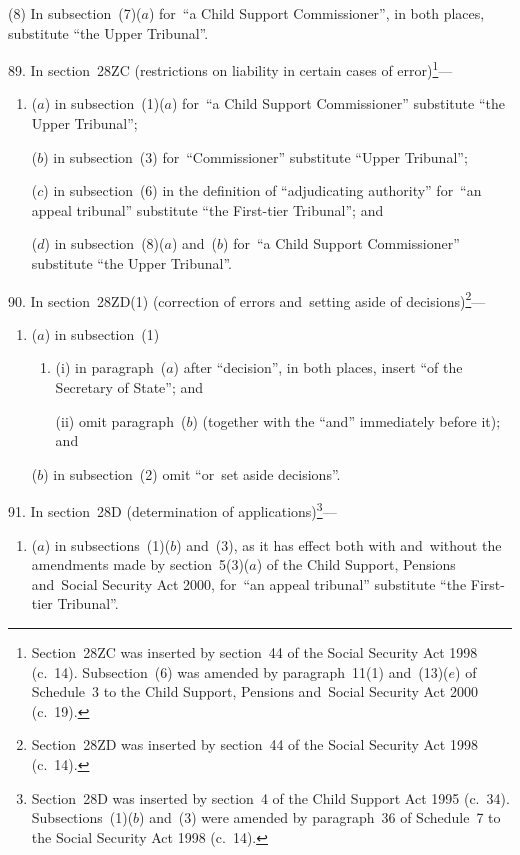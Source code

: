 \documentclass[12pt,a4paper]{article}
\begin{document}
(8) In subsection~(7)($a$)  for~“a Child Support Commissioner”, in both places, substitute “the Upper Tribunal”.

\medskip

89.  In section~28ZC (restrictions on liability in certain cases of error)\footnote{Section~28ZC was inserted by section~44 of the Social Security Act 1998 (c.~14). Subsection~(6) was amended by paragraph~11(1) and~(13)($e$) of Schedule~3 to the Child Support, Pensions and~Social Security Act 2000 (c.~19).}—
\begin{enumerate}\item[]
($a$) in subsection~(1)($a$)  for~“a Child Support Commissioner” substitute “the Upper Tribunal”;

($b$) in subsection~(3) for~“Commissioner” substitute “Upper Tribunal”;

($c$) in subsection~(6) in the definition of “adjudicating authority” for~“an appeal tribunal” substitute “the First-tier Tribunal”; and

($d$) in subsection~(8)($a$)  and~($b$)  for~“a Child Support Commissioner” substitute “the Upper Tribunal”.
\end{enumerate}

\medskip

90.  In section~28ZD(1) (correction of errors and~setting aside of decisions)\footnote{Section~28ZD was inserted by section~44 of the Social Security Act 1998 (c.~14).}—
\begin{enumerate}\item[]
($a$) in subsection~(1)
\begin{enumerate}\item[]
(i) in paragraph~($a$)  after “decision”, in both places, insert “of the Secretary of State”; and

(ii) omit paragraph~($b$)  (together with the “and” immediately before it); and
\end{enumerate}

($b$) in subsection~(2) omit “or~set aside decisions”.
\end{enumerate}

\medskip

91.  In section~28D (determination of applications)\footnote{Section~28D was inserted by section~4 of the Child Support Act 1995 (c.~34). Subsections~(1)($b$) and~(3) were amended by paragraph~36 of Schedule~7 to the Social Security Act 1998 (c.~14).}---
\begin{enumerate}\item[]
($a$) in subsections~(1)($b$)  and~(3), as it has effect both with and~without the amendments made by section~5(3)($a$)  of the Child Support, Pensions and~Social Security Act 2000, for~“an appeal tribunal” substitute “the First-tier Tribunal”.
\end{enumerate}
\end{document}
